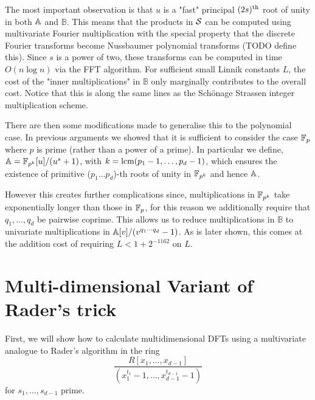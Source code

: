 The most important observation is that $u$ is a "fast" principal $(2s)^{\textrm{th}}$ root of unity in both ${\mathbb A}$ and $\mathbb{B}$. This means that the products in $\mathcal S$ can be computed using multivariate Fourier multiplication with the special property that the discrete Fourier transforms become Nussbaumer polynomial transforms (TODO define this). Since $s$ is a power of two, these transforms can be computed in time $O(n \log n)$ via the FFT algorithm. For sufficient small Linnik constants $L$, the cost of the "inner multiplications" in $\mathbb{B}$ only marginally contributes to the overall cost. Notice that this is along the same lines as the Sch\"{o}nage Strassen integer multiplication scheme.

There are then some modifications made to generalise this to the polynomial case. In previous arguments we showed that it is sufficient to consider the case ${\mathbb F}_p$ where $p$ is prime (rather than a power of a prime). In particular we define, ${\mathbb A} = {\mathbb F}_{p^k}[u] / (u^s + 1)$, with $k = \textrm{lcm}(p_1 - 1, \ldots, p_d - 1)$, which ensures the existence of primitive ($p_1 \ldots p_d$)-th roots of unity in ${\mathbb F}_{p^k}$ and hence ${\mathbb A}$.

However this creates further complications since, multiplications in ${\mathbb F}_{p^k}$ take exponentially longer than those in ${\mathbb F}_p$, for this reason we additionally require that $q_1, \ldots, q_d$ be pairwise coprime. This allows us to reduce multiplications in $\mathbb{B}$ to univariate multiplications in ${\mathbb A}[v]/(v^{q_1\cdots q_d} - 1)$. As is later shown, this comes at the addition cost of requiring $L < 1 + 2^{-1162}$ on $L$.

\section{Multi-dimensional Variant of Rader's trick}%
\label{sec:multi_dimensional_variant_of_rader_s_trick}

First, we will show how to calculate multidimensional DFTs using a multivariate analogue to Rader's algorithm in the ring
\[
    \frac{R[x_1, \ldots, x_{d-1}]}{(x_1^{t_1} - 1, \ldots, x_{d-1}^{t_{d-1}} - 1)}
\]
for $s_1, \ldots, s_{d-1}$ prime.



